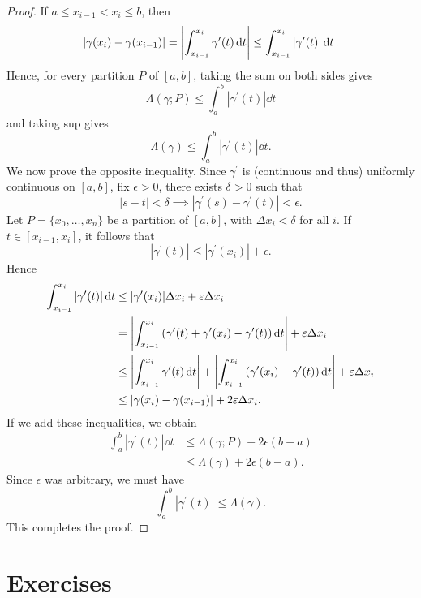 \begin{proof}
If $a\le x_{i-1}<x_i\le b$, then
\[|\gamma(x_i)-\gamma(x_{i-1})|=\left|\int_{x_{i-1}}^{x_i}\gamma^\prime(t)\dd{t}\right|\le\int_{x_{i-1}}^{x_i}|\gamma^\prime(t)|\dd{t}.\]
Hence, for every partition $P$ of $[a,b]$, taking the sum on both sides gives
\[\Lambda(\gamma;P)\le\int_{a}^{b}|\gamma^\prime(t)|\dd{t}\]
and taking sup gives
\[\Lambda(\gamma)\le\int_{a}^{b}|\gamma^\prime(t)|\dd{t}.\]
We now prove the opposite inequality. Since $\gamma^\prime$ is (continuous and thus) uniformly continuous on $[a,b]$, fix $\epsilon>0$, there exists $\delta>0$ such that
\[|s-t|<\delta\implies|\gamma^\prime(s)-\gamma^\prime(t)|<\epsilon.\]
Let $P=\{x_0,\dots,x_n\}$ be a partition of $[a,b]$, with $\Delta x_i<\delta$ for all $i$. If $t\in[x_{i-1},x_i]$, it follows that
\[|\gamma^\prime(t)|\le|\gamma^\prime(x_i)|+\epsilon.\]
Hence
\begin{align*}
\int_{x_{i-1}}^{x_i}|\gamma^\prime(t)|\dd{t}
&\le|\gamma^\prime(x_i)|\Delta x_i+\varepsilon\Delta x_i\\
&=\left|\int_{x_{i-1}}^{x_i}\left(\gamma^\prime(t)+\gamma^\prime(x_i)-\gamma^\prime(t)\right)\dd{t}\right|+\varepsilon\Delta x_i\\
&\le\left|\int_{x_{i-1}}^{x_i}\gamma^\prime(t)\dd{t}\right|+\left|\int_{x_{i-1}}^{x_i}\left(\gamma^\prime(x_i)-\gamma^\prime(t)\right)\dd{t}\right|+\varepsilon\Delta x_i\\
&\le|\gamma(x_i)-\gamma(x_{i-1})|+2\varepsilon\Delta x_i.
\end{align*}
If we add these inequalities, we obtain
\begin{align*}
\int_{a}^{b}|\gamma^\prime(t)|\dd{t}
&\le\Lambda(\gamma;P)+2\epsilon(b-a)\\
&\le\Lambda(\gamma)+2\epsilon(b-a).
\end{align*}
Since $\epsilon$ was arbitrary, we must have
\[\int_{a}^{b}|\gamma^\prime(t)|\le\Lambda(\gamma).\]
This completes the proof. 
\end{proof}
\pagebreak

\section*{Exercises}
